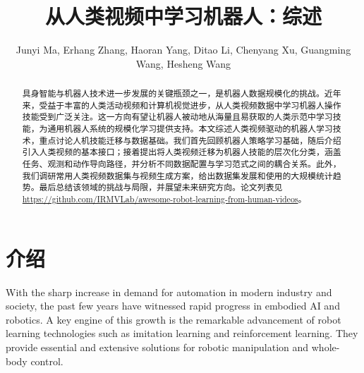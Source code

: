 \documentclass[Afour,sageh,times]{sagej}
\begin{document}

\title{从人类视频中学习机器人：综述}

\author{Junyi Ma, Erhang Zhang, Haoran Yang, Ditao Li, Chenyang Xu, Guangming Wang, Hesheng Wang}






\begin{abstract}
具身智能与机器人技术进一步发展的关键瓶颈之一，是机器人数据规模化的挑战。近年来，受益于丰富的人类活动视频和计算机视觉进步，从人类视频数据中学习机器人操作技能受到广泛关注。这一方向有望让机器人被动地从海量且易获取的人类示范中学习技能，为通用机器人系统的规模化学习提供支持。本文综述人类视频驱动的机器人学习技术，重点讨论人机技能迁移与数据基础。我们首先回顾机器人策略学习基础，随后介绍引入人类视频的基本接口；接着提出将人类视频迁移为机器人技能的层次化分类，涵盖任务、观测和动作导向路径，并分析不同数据配置与学习范式之间的耦合关系。此外，我们调研常用人类视频数据集与视频生成方案，给出数据集发展和使用的大规模统计趋势。最后总结该领域的挑战与局限，并展望未来研究方向。论文列表见 \url{https://github.com/IRMVLab/awesome-robot-learning-from-human-videos}。
\end{abstract}


\maketitle


\section{介绍}

With the sharp increase in demand for automation in modern industry and society, the past few years have witnessed rapid progress in embodied AI and robotics. A key engine of this growth is the remarkable advancement of robot learning technologies such as imitation learning and reinforcement learning. They provide essential and extensive solutions for robotic manipulation and whole-body control. 
\end{document}
